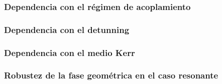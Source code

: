 \subsubsection{Dependencia con el régimen de acoplamiento}

\subsubsection{Dependencia con el detunning}

\subsubsection{Dependencia con el medio Kerr}

\subsubsection{Robustez de la fase geométrica en el caso resonante}
